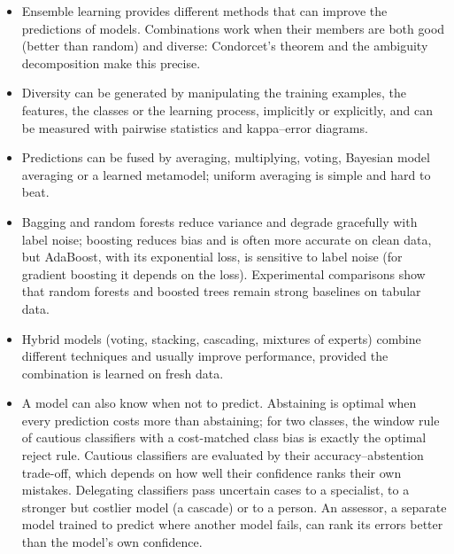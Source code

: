 \begin{itemize}
  \item Ensemble learning provides different methods that can improve the predictions of models.
        Combinations work when their members are both good (better than random) and diverse:
        Condorcet's theorem and the ambiguity decomposition make this precise.
  \item Diversity can be generated by manipulating the training examples, the features, the
        classes or the learning process, implicitly or explicitly, and can be measured with
        pairwise statistics and kappa--error diagrams.
  \item Predictions can be fused by averaging, multiplying, voting, Bayesian model averaging or a
        learned metamodel; uniform averaging is simple and hard to beat.
  \item Bagging and random forests reduce variance and degrade gracefully with label noise; boosting
        reduces bias and is often more accurate on clean data, but AdaBoost, with its exponential loss,
        is sensitive to label noise (for gradient boosting it depends on the loss). Experimental
        comparisons show that random forests and boosted trees remain strong baselines on tabular data.
  \item Hybrid models (voting, stacking, cascading, mixtures of experts) combine different
        techniques and usually improve performance, provided the combination is learned on fresh
        data.
  \item A model can also know when not to predict. Abstaining is optimal when every prediction
        costs more than abstaining; for two classes, the window rule of cautious classifiers with a
        cost-matched class bias is exactly the optimal reject rule. Cautious classifiers are
        evaluated by their accuracy--abstention trade-off, which depends on how well their
        confidence ranks their own mistakes. Delegating classifiers pass uncertain cases to a
        specialist, to a stronger but costlier model (a cascade) or to a person. An assessor, a separate model trained to predict where another model fails, can rank
its errors better than the model's own confidence.

\end{itemize}
